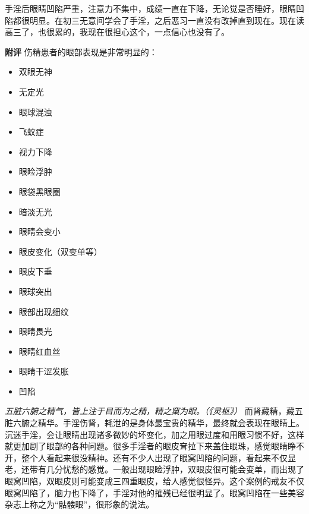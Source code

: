 \begin{case}[面部凹陷]
    手淫后眼睛凹陷严重，注意力不集中，成绩一直在下降，无论觉是否睡好，眼睛凹陷都很明显。在初三无意间学会了手淫，之后恶习一直没有改掉直到现在。现在读高三了，也很累的，我现在很担心这个，一点信心也没有了。

    \textbf{附评} 伤精患者的眼部表现是非常明显的：\begin{multicols}{3}
        \begin{itemize}
            \item 双眼无神
            \item 无定光
            \item 眼球混浊
            \item 飞蚊症
            \item 视力下降
            \item 眼睑浮肿
            \item 眼袋黑眼圈
            \item 暗淡无光
            \item 眼睛会变小
            \item 眼皮变化（双变单等）
            \item 眼皮下垂
            \item 眼球突出
            \item 眼部出现细纹
            \item 眼睛畏光
            \item 眼睛红血丝
            \item 眼睛干涩发胀
            \item 凹陷
        \end{itemize}
    \end{multicols} \textit{五脏六腑之精气，皆上注于目而为之精，精之窠为眼。（《灵枢》）} 而肾藏精，藏五脏六腑之精华。手淫伤肾，耗泄的是身体最宝贵的精华，最终就会表现在眼睛上。沉迷手淫，会让眼睛出现诸多微妙的坏变化，加之用眼过度和用眼习惯不好，这样就更加剧了眼部的各种问题。很多手淫者的眼皮耷拉下来盖住眼珠，感觉眼睛睁不开，整个人看起来很没精神。还有不少人出现了眼窝凹陷的问题，看起来不仅显老，还带有几分忧愁的感觉。一般出现眼睑浮肿，双眼皮很可能会变单，而出现了眼窝凹陷，双眼皮则可能变成三四重眼皮，给人感觉很怪异。这个案例的戒友不仅眼窝凹陷了，脑力也下降了，手淫对他的摧残已经很明显了。眼窝凹陷在一些美容杂志上称之为“骷髅眼”，很形象的说法。
\end{case}

